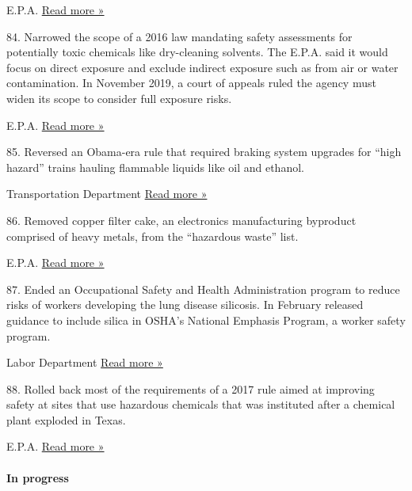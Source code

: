  E.P.A. \textbar{}
\href{https://www.nytimes3xbfgragh.onion/2019/07/18/climate/epa-chlorpyrifos-pesticide-ban.html}{Read
more »}

84. Narrowed the scope of a 2016 law mandating safety assessments for
potentially toxic chemicals like dry-cleaning solvents. The E.P.A. said
it would focus on direct exposure and exclude indirect exposure such as
from air or water contamination. In November 2019, a court of appeals
ruled the agency must widen its scope to consider full exposure risks.

 E.P.A. \textbar{}
\href{https://www.nytimes3xbfgragh.onion/2018/06/07/us/politics/epa-toxic-chemicals.html}{Read
more »}

85. Reversed an Obama-era rule that required braking system upgrades for
``high hazard'' trains hauling flammable liquids like oil and ethanol.

 Transportation Department \textbar{}
\href{https://www.opb.org/news/article/oil-train-safety-rule-rollback-by-trump/}{Read
more »}

86. Removed copper filter cake, an electronics manufacturing byproduct
comprised of heavy metals, from the ``hazardous waste'' list.

 E.P.A. \textbar{}
\href{https://www.federalregister.gov/documents/2017/10/02/2017-21112/hazardous-waste-management-system-identification-and-listing-of-hazardous-waste}{Read
more »}

87. Ended an Occupational Safety and Health Administration program to
reduce risks of workers developing the lung disease silicosis. In
February released guidance to include silica in OSHA's National Emphasis
Program, a worker safety program.

 Labor Department \textbar{}
\href{https://www.npr.org/sections/health-shots/2019/10/02/766028237/workers-are-falling-ill-even-dying-after-making-kitchen-countertops}{Read
more »}

88. Rolled back most of the requirements of a 2017 rule aimed at
improving safety at sites that use hazardous chemicals that was
instituted after a chemical plant exploded in Texas.

 E.P.A. \textbar{}
\href{https://eelp.law.harvard.edu/2017/09/chemical-disaster-rule/}{Read
more »}

\hypertarget{in-progress-5}{%
\paragraph{In progress}\label{in-progress-5}}

